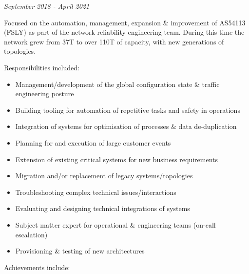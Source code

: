 \emph{September 2018 - April 2021}

Focused on the automation, management, expansion \& improvement of
AS54113 (FSLY) as part of the network reliability engineering team.
During this time the network grew from 37T to over 110T of capacity,
with new generations of topologies.

Responsibilities included:

\begin{itemize}
\tightlist
\item
  Management/development of the global configuration state \& traffic
  engineering posture
\item
  Building tooling for automation of repetitive tasks and safety in
  operations
\item
  Integration of systems for optimisation of processes \& data
  de-duplication
\item
  Planning for and execution of large customer events
\item
  Extension of existing critical systems for new business requirements
\item
  Migration and/or replacement of legacy systems/topologies
\item
  Troubleshooting complex technical issues/interactions
\item
  Evaluating and designing technical integrations of systems
\item
  Subject matter expert for operational \& engineering teams (on-call
  escalation)
\item
  Provisioning \& testing of new architectures
\end{itemize}

Achievements include:

